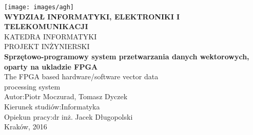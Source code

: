 \begin{titlepage}
    \begin{center}

        \texttt{[image: images/agh]}\\
        \vspace{0.5cm}
		\textbf{WYDZIAŁ INFORMATYKI, ELEKTRONIKI I TELEKOMUNIKACJI}\\
		\vspace{0.5cm}
		KATEDRA INFORMATYKI\\
		\vspace{2.5cm}
		PROJEKT INŻYNIERSKI\\
		\vspace{1cm}
	 	\textbf{Sprzętowo-programowy system przetwarzania danych wektorowych,\\oparty na ukladzie FPGA}\\
	 	\vspace{0.5cm}
		The FPGA based hardware/software vector data\\ processing system\\
		\vspace{3cm}
		Autor:\hfill Piotr Moczurad, Tomasz Dyczek\\
		\vspace{0.25cm}
		Kierunek studiów:\hfill Informatyka\\
		\vspace{0.25cm}
		Opiekun pracy:\hfill dr inż. Jacek Długopolski\\
		\vfill		
		Kraków, 2016

		
        
    \end{center}
\end{titlepage}